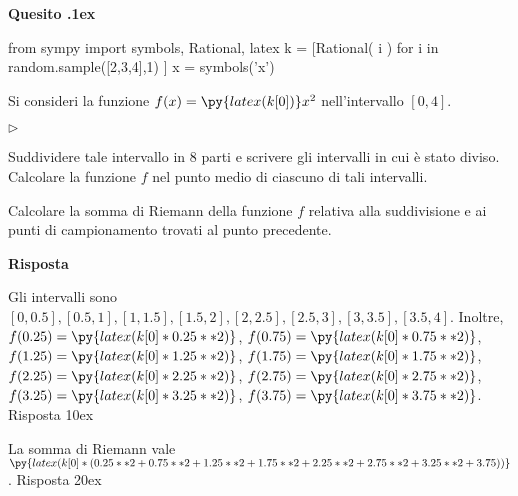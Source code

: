 \documentclass[11pt,twoside,a4paper]{article}
\newcommand{\mylabel}[1]{#1\hfill}
\renewenvironment{itemize}
  {\begin{list}{$\triangleright$}{%
   \setlength{\parskip}{0mm}
   \setlength{\topsep}{.4\baselineskip}
   \setlength{\rightmargin}{0mm}
   \setlength{\listparindent}{0mm}
   \setlength{\itemindent}{0mm}
   \setlength{\labelwidth}{2ex}
   \setlength{\itemsep}{.4\baselineskip}
   \setlength{\parsep}{0mm}
   \setlength{\partopsep}{0mm}
   \setlength{\labelsep}{1ex}
   \setlength{\leftmargin}{\labelwidth+\labelsep}
   \let\makelabel\mylabel}}{%
   \end{list}\vspace*{-1.3mm}}
\newcounter{quesito}
\newenvironment{question}{\bigskip\addtocounter{quesito}{1}\bigskip\bigskip\par\textbf{Quesito \thequesito.\kern1ex}}{\vspace{\parskip}}
\newenvironment{answer}{\par\textbf{Risposta\quad}}{\vspace{\parskip}}
\begin{document}
\begin{question}
\begin{pycode}
from sympy import  symbols, Rational, latex
k = [Rational( i ) for i in random.sample([2,3,4],1) ]
x = symbols('x')
\end{pycode}
Si consideri la funzione $f(x) = \py{latex(k[0])}x^2$ nell'intervallo $[0,4]$.
\begin{itemize}
\item[1.] Suddividere tale intervallo in $8$ parti e scrivere gli intervalli in cui \`e stato diviso. Calcolare la funzione $f$ nel punto medio di ciascuno di tali intervalli.
\item[2.] Calcolare la somma di Riemann della funzione $f$ relativa alla suddivisione e ai punti di campionamento trovati al punto precedente.
\end{itemize}
\begin{answer}

{\color{blue}
Gli intervalli sono $[0, 0.5], [0.5, 1], [1, 1.5], [1.5, 2], [2, 2.5], [2.5, 3], [3, 3.5], [3.5, 4]$.
Inoltre, $f(0.25) = \py{latex(k[0]*0.25**2)}$, $f(0.75) = \py{latex(k[0]*0.75**2)}$, $f(1.25) = \py{latex(k[0]*1.25**2)}$, $f(1.75) = \py{latex(k[0]*1.75**2)}$, $f(2.25) = \py{latex(k[0]*2.25**2)}$, $f(2.75) = \py{latex(k[0]*2.75**2)}$, $f(3.25) = \py{latex(k[0]*3.25**2)}$, $f(3.75) = \py{latex(k[0]*3.75**2)}$.
\hfill Risposta 1\kern0ex}

\smallskip
{\color{blue}La somma di Riemann vale $\py{latex(k[0]*(0.25**2+0.75**2+1.25**2+1.75**2+2.25**2+2.75**2+3.25**2+3.75))}$.
\hfill Risposta 2\kern0ex}

\end{answer}
\end{question}
\end{document}
